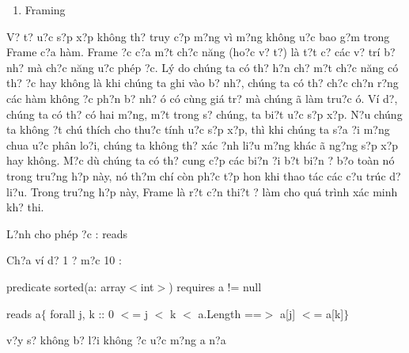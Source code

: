 \documentclass{article} %
\begin{document}
\begin{enumerate}
\item  Framing 
\end{enumerate}

V? t? {\dj}u?c s?p x?p kh\^{o}ng th? truy c?p m?ng v\`{i} m?ng kh\^{o}ng {\dj}u?c bao g?m trong Frame c?a h\`{a}m. Frame {\dj}?c c?a m?t ch?c n\u{a}ng (ho?c v? t?) l\`{a} t?t c? c\'{a}c v? tr\'{i} b? nh? m\`{a} ch?c n\u{a}ng {\dj}u?c ph\'{e}p {\dj}?c. L\'{y} do ch\'{u}ng ta c\'{o} th? h?n ch? m?t ch?c n\u{a}ng c\'{o} th? {\dj}?c hay kh\^{o}ng l\`{a} khi ch\'{u}ng ta ghi v\`{a}o b? nh?, ch\'{u}ng ta c\'{o} th? ch?c ch?n r?ng c\'{a}c h\`{a}m kh\^{o}ng {\dj}?c ph?n b? nh? {\dj}\'{o} c\'{o} c\`{u}ng gi\'{a} tr? m\`{a} ch\'{u}ng {\dj}\~{a} l\`{a}m tru?c {\dj}\'{o}. V\'{i} d?, ch\'{u}ng ta c\'{o} th? c\'{o} hai m?ng, m?t trong s? ch\'{u}ng, ta bi?t {\dj}u?c s?p x?p. N?u ch\'{u}ng ta kh\^{o}ng {\dj}?t ch\'{u} th\'{i}ch cho thu?c t\'{i}nh {\dj}u?c s?p x?p, th\`{i} khi ch\'{u}ng ta s?a {\dj}?i m?ng chua {\dj}u?c ph\^{a}n lo?i, ch\'{u}ng ta kh\^{o}ng th? x\'{a}c {\dj}?nh li?u m?ng kh\'{a}c {\dj}\~{a} ng?ng s?p x?p hay kh\^{o}ng. M?c d\`{u} ch\'{u}ng ta c\'{o} th? cung c?p c\'{a}c bi?n {\dj}?i b?t bi?n {\dj}? b?o to\`{a}n n\'{o} trong tru?ng h?p n\`{a}y, n\'{o} th?m ch\'{i} c\`{o}n ph?c t?p hon khi thao t\'{a}c c\'{a}c c?u tr\'{u}c d? li?u. Trong tru?ng h?p n\`{a}y, Frame l\`{a} r?t c?n thi?t {\dj}? l\`{a}m cho qu\'{a} tr\`{i}nh x\'{a}c minh kh? thi.

\noindent L?nh cho ph\'{e}p {\dj}?c : reads

\noindent 

\noindent 

\noindent 

\noindent Ch?a v\'{i} d? 1 ? m?c 10 :

\noindent predicate sorted(a: array$<$int$>$)   requires a != null

\noindent    reads a$\{$   forall j, k :: 0 $<$= j $<$ k $<$ a.Length ==$>$ a[j] $<$= a[k]$\}$

\noindent 

\noindent  v?y s? kh\^{o}ng b? l?i kh\^{o}ng {\dj}?c {\dj}u?c m?ng a n?a
\end{document}

